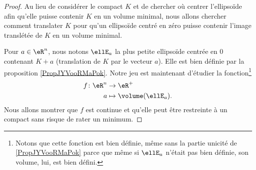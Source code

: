 \begin{proof}
	Au lieu de considérer le compact \( K\) et de chercher où centrer l'ellipsoïde afin qu'elle puisse contenir \( K\) en un volume minimal, nous allons chercher comment translater \( K\) pour qu'un ellipsoïde centré en zéro puisse contenir l'image translétée de \( K \) en un volume minimal.

	Pour \( a\in \eR^n\), nous notons \( \ellE_a\) la plus petite ellipsoïde centrée en \( 0\) contenant \( K+a\) (translation de \( K\) par le vecteur \( a\)). Elle est bien définie par la proposition \ref{PropJYVooRMaPok}. Notre jeu est maintenant d'étudier la fonction\footnote{ Notons que cette fonction est bien définie, même sans la partie unicité de \ref{PropJYVooRMaPok} parce que même si \( \ellE_a\) n'était pas bien définie, son volume, lui, est bien défini.}
	\begin{equation}
		\begin{aligned}
			f\colon \eR^n & \to \eR^+                 \\
			a             & \mapsto \volume(\ellE_a).
		\end{aligned}
	\end{equation}
	Nous allons montrer que \( f\) est continue et qu'elle peut être restreinte à un compact sans risque de rater un minimum.


\end{proof}
